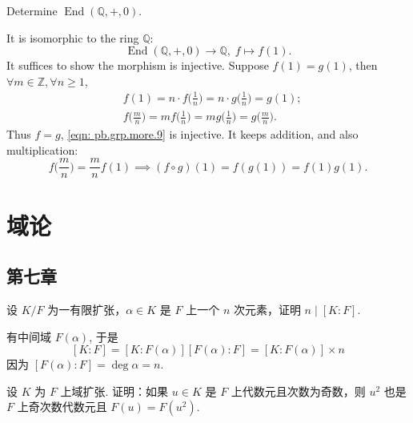 \setcounter{pb}{10}
\begin{problem}
    Determine $\operatorname{End}(\mathbb{Q},+,0)$.
\end{problem}

\begin{solution}
    It is isomorphic to the ring $\mathbb{Q}$:
        \begin{equation}
            \label{eqn: pb.grp.more.9}
            \operatorname{End}(\mathbb{Q},+,0) \to \mathbb{Q},\; f\mapsto f(1). 
        \end{equation}
    It suffices to show the morphism is injective.  Suppose $f(1)=g(1)$, then $\forall m\in\mathbb{Z},\forall n\geq1  $, 
        \[
            \begin{split}
                & f(1)=n\cdot f\Big(\frac{1}{n}\Big)=n\cdot g\Big(\frac{1}{n}\Big)=g(1);\\
                & f\Big(\frac{m}{n}\Big)=m f\Big(\frac{1}{n}\Big)=m g\Big(\frac{1}{n}\Big)=g\Big(\frac{m}{n}\Big).
            \end{split}
        \]
    Thus $f=g$, \eqref{eqn: pb.grp.more.9} is injective. 
    It keeps addition, and also multiplication:
        \[
            f\Big(\frac{m}{n}\Big)=\frac{m}{n}f(1)\implies(f\circ g)(1)=f( g(1) )=f(1) g(1).
        \]
\end{solution}

\section{域论}
\subsection{第七章}

\setcounter{pb}{2}
\begin{problem}
    设 $ K/F $ 为一有限扩张，$ \alpha \in K $ 是 $ F $ 上一个 $ n $ 次元素，证明 $ n \mid [K : F] $.
\end{problem}

\begin{solution}
    有中间域 $F(\alpha) $, 于是 
        \[
            [K:F]=[K:F(\alpha)][F(\alpha):F]=[K:F(\alpha)]\times n
        \]
    因为 $[F(\alpha):F]=\deg\alpha=n$.
\end{solution}

\setcounter{pb}{4}
\begin{problem}
    设 $ K $ 为 $ F $ 上域扩张. 证明：如果 $ u \in K $ 是 $ F $ 上代数元且次数为奇数，则 $ u^2 $ 也是 $ F $ 上奇次数代数元且 $ F(u) = F(u^2) $.
\end{problem}

